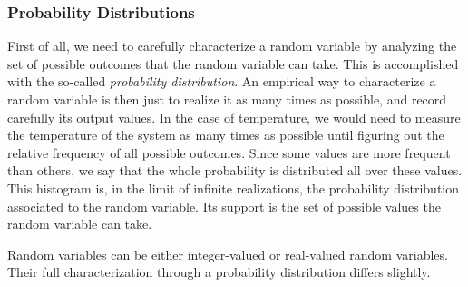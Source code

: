 \documentclass{article}
\begin{document}
\subsubsection{Probability Distributions}
First of all, we need to carefully characterize a random variable by analyzing the set of possible outcomes that the random variable can take. This is accomplished with the so-called {\it probability distribution}. An empirical way to characterize a random variable is then just to realize it as many times as possible, and record carefully its output values. In the case of temperature, we would need to measure the temperature of the system as many times as possible until figuring out the relative frequency of all possible outcomes. Since some values are more frequent than others, we say that the whole probability is distributed all over these values. This histogram is, in the limit of infinite realizations, the probability distribution associated to the random variable. Its support is the set of possible values the random variable can take. 
\smallskip

Random variables can be either integer-valued or real-valued random variables. Their full characterization through a probability distribution differs slightly. 
\smallskip
\end{document}

